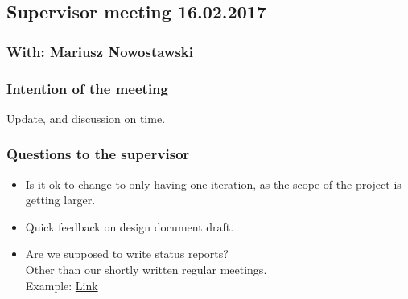 \documentclass[hidelinks]{article}
\begin{document}
\begin{center}
\subsection*{Supervisor meeting 16.02.2017}
\subsubsection*{With: Mariusz Nowostawski}
\end{center}

\bigskip


\subsubsection*{Intention of the meeting}
Update, and discussion on time.


\subsubsection*{Questions to the supervisor}
\begin{itemize}
    \item 
    Is it ok to change to only having one iteration, as the scope of the project is getting larger.

    \item
    Quick feedback on design document draft.

    \item
    Are we supposed to write status reports?\\ 
    Other than our shortly written regular meetings.\\
    Example: \href{https://fronter.com/hig/links/files.phtml/1602890066$1063371470$/FagstoffRessurser/02+Viktige+dokumenter+du+trenger/Retningslinjer+bacheloroppgave+statusrapport.pdf}{Link}
\end{itemize}
\end{document}
